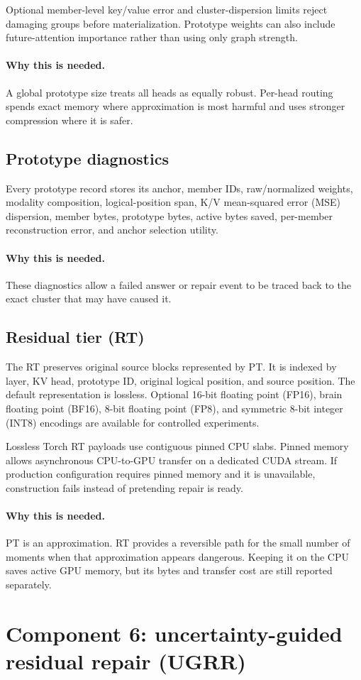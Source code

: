 \documentclass[11pt]{article}
\newcommand{\why}{\paragraph{Why this is needed.}}
\begin{document}
Optional member-level key/value error and cluster-dispersion limits reject damaging groups before
materialization. Prototype weights can also include future-attention importance rather than using
only graph strength.

\why A global prototype size treats all heads as equally robust. Per-head routing spends exact
memory where approximation is most harmful and uses stronger compression where it is safer.

\subsection{Prototype diagnostics}

Every prototype record stores its anchor, member IDs, raw/normalized weights, modality
composition, logical-position span, K/V mean-squared error (MSE) dispersion, member bytes,
prototype bytes, active bytes saved, per-member reconstruction error, and anchor selection
utility.

\why These diagnostics allow a failed answer or repair event to be traced back to the exact
cluster that may have caused it.

\subsection{Residual tier (RT)}

The RT preserves original source blocks represented by PT. It is indexed by layer, KV head,
prototype ID, original logical position, and source position. The default representation is
lossless. Optional 16-bit floating point (FP16), brain floating point (BF16), 8-bit floating point
(FP8), and symmetric 8-bit integer (INT8) encodings are available for controlled experiments.

Lossless Torch RT payloads use contiguous pinned CPU slabs. Pinned memory allows asynchronous
CPU-to-GPU transfer on a dedicated CUDA stream. If production configuration requires pinned
memory and it is unavailable, construction fails instead of pretending repair is ready.

\why PT is an approximation. RT provides a reversible path for the small number of moments when
that approximation appears dangerous. Keeping it on the CPU saves active GPU memory, but its
bytes and transfer cost are still reported separately.

\section{Component 6: uncertainty-guided residual repair (UGRR)}
\label{sec:repair}
\end{document}
